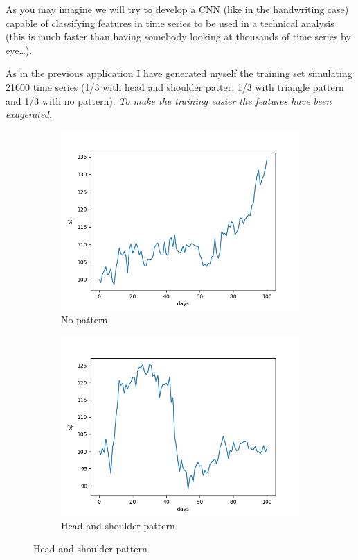 \documentclass[11pt]{article}
\begin{document}
As you may imagine we will try to develop a CNN (like in the handwriting
case) capable of classifying features in time series to be used in a
technical analysis (this is much faster than having somebody looking at
thousands of time series by eye\ldots{}).

As in the previous application I have generated myself the training set
simulating 21600 time series (1/3 with head and shoulder patter, 1/3
with triangle pattern and 1/3 with no pattern). \emph{To make the
training easier the features have been exagerated.}

\begin{figure}
  \begin{subfigure}{.5\textwidth}
    \centering
    \includegraphics[width=.8\linewidth]{image_1.png}
    \caption{No pattern}
  \end{subfigure}
  \begin{subfigure}{.5\textwidth}
    \centering    
    \includegraphics[width=.8\linewidth]{image_2.png}
    \caption{Head and shoulder pattern}    
  \end{subfigure}

\end{figure}
\end{document}
